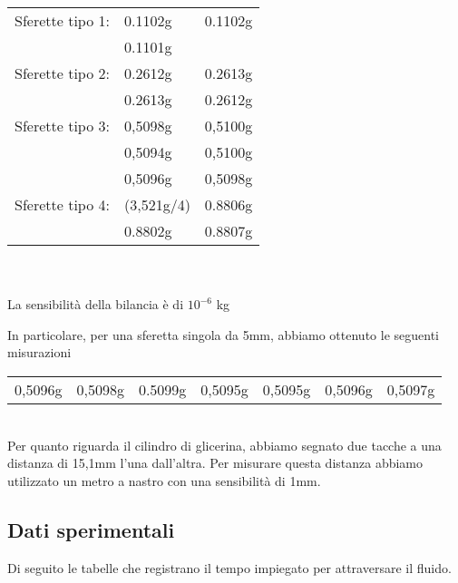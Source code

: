 \documentclass[a4paper,10pt]{report}
\begin{document}
\begin{tabular}{lll}
 Sferette tipo 1:
 & 0.1102g & 0.1102g \\
 & 0.1101g & \\
 \midrule
 Sferette tipo 2: 
 & 0.2612g & 0.2613g \\
 & 0.2613g & 0.2612g \\
 \midrule
 Sferette tipo 3: 
 & 0,5098g & 0,5100g \\
 & 0,5094g & 0,5100g \\
 & 0,5096g & 0,5098g \\
 \midrule
 Sferette tipo 4:
  & (3,521g/4) & 0.8806g \\
  & 0.8802g & 0.8807g \\
\end{tabular}
\\
\\
La sensibilità della bilancia è di $10^{-6}$ kg

In particolare, per una sferetta singola da 5mm, abbiamo ottenuto le seguenti misurazioni\\
\begin{tabular}{ccccccc}
0,5096g & 0,5098g & 0.5099g & 0,5095g & 0,5095g & 0,5096g & 0,5097g
\end{tabular}
\\
Per quanto riguarda il cilindro di glicerina, abbiamo segnato due tacche a una distanza di 15,1mm l'una dall'altra.
Per misurare questa distanza abbiamo utilizzato un metro a nastro con una sensibilità di 1mm.

\subsection{Dati sperimentali}
Di seguito le tabelle che registrano il tempo impiegato per attraversare il fluido.
\end{document}
